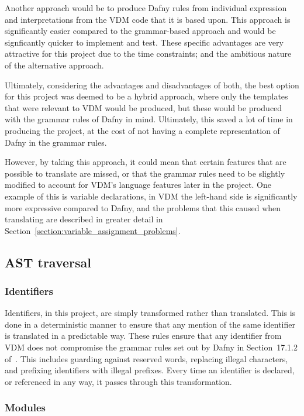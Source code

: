 \documentclass{entcs}
\begin{document}
Another approach would be to produce Dafny rules from individual expression and interpretations from the VDM code that it is based upon. This approach is significantly easier compared to the grammar-based approach and would be signficantly quicker to implement and test. These specific advantages are very attractive for this project due to the time constraints; and the ambitious nature of the alternative approach. 

Ultimately, considering the advantages and disadvantages of both, the best option for this project was deemed to be a hybrid approach, where only the templates that were relevant to VDM would be produced, but these would be produced with the grammar rules of Dafny in mind. Ultimately, this saved a lot of time in producing the project, at the cost of not having a complete representation of Dafny in the grammar rules. 

However, by taking this approach, it could mean that certain features that are possible to translate are missed, or that the grammar rules need to be slightly modified to account for VDM's language features later in the project. One example of this is variable declarations, in VDM the left-hand side is significantly more expressive compared to Dafny, and the problems that this caused when translating are described in greater detail in Section~\ref{section:variable_assignment_problems}.

\subsection{AST traversal}

\subsubsection{Identifiers}\label{section:identifiers}

Identifiers, in this project, are simply transformed rather than translated. This is done in a deterministic manner to ensure that any mention of the same identifier is translated in a predictable way. These rules ensure that any identifier from VDM does not compromise the grammar rules set out by Dafny in Section~17.1.2 of~\cite{DfyRef}. This includes guarding against reserved words, replacing illegal characters, and prefixing identifiers with illegal prefixes. Every time an identifier is declared, or referenced in any way, it passes through this transformation.

\subsubsection{Modules} 
\end{document}
